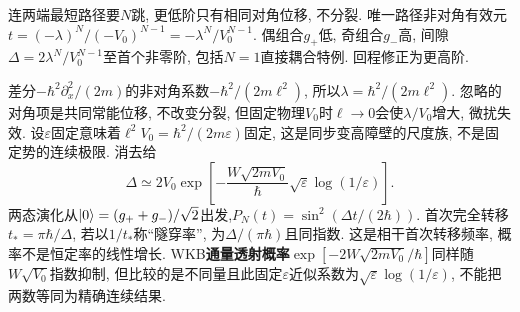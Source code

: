 \begin{solution}
连两端最短路径要$N$跳, 更低阶只有相同对角位移, 不分裂. 唯一路径非对角有效元$t=(-\lambda)^N/(-V_0)^{N-1}=-\lambda^N/V_0^{N-1}$. 偶组合$g_+$低, 奇组合$g_-$高, 间隙$\Delta=2\lambda^N/V_0^{N-1}$至首个非零阶, 包括$N=1$直接耦合特例. 回程修正为更高阶.

差分$-\hbar^2\partial_x^2/(2m)$的非对角系数$-\hbar^2/(2m\ell^2)$, 所以$\lambda=\hbar^2/(2m\ell^2)$. 忽略的对角项是共同常能位移, 不改变分裂, 但固定物理$V_0$时$\ell\to0$会使$\lambda/V_0$增大, 微扰失效. 设$\varepsilon$固定意味着$\ell^2V_0=\hbar^2/(2m\varepsilon)$固定, 这是同步变高障壁的尺度族, 不是固定势的连续极限. 消去给
\[
\Delta\simeq2V_0\exp\!\left[-\frac{W\sqrt{2mV_0}}\hbar\sqrt\varepsilon\log(1/\varepsilon)\right].
\]
两态演化从$\lvert 0\rangle=(g_++g_-)/\sqrt2$出发,$P_N(t)=\sin^2(\Delta t/(2\hbar))$. 首次完全转移$t_* =\pi\hbar/\Delta$, 若以$1/t_*$称“隧穿率”, 为$\Delta/(\pi\hbar)$且同指数. 这是相干首次转移频率, 概率不是恒定率的线性增长. WKB\textbf{通量透射概率}$\exp[-2W\sqrt{2mV_0}/\hbar]$同样随$W\sqrt{V_0}$指数抑制, 但比较的是不同量且此固定$\varepsilon$近似系数为$\sqrt\varepsilon\log(1/\varepsilon)$, 不能把两数等同为精确连续结果.
\end{solution}
